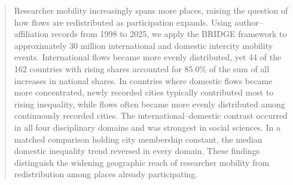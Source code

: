 \begin{abstract}
\noindent Researcher mobility increasingly spans more places, raising the question of how flows are redistributed as participation expands. Using author--affiliation records from 1998 to 2025, we apply the BRIDGE framework to approximately 30 million international and domestic intercity mobility events. International flows became more evenly distributed, yet 44 of the 162 countries with rising shares accounted for 85.0\% of the sum of all increases in national shares. In countries where domestic flows became more concentrated, newly recorded cities typically contributed most to rising inequality, while flows often became more evenly distributed among continuously recorded cities. The international--domestic contrast occurred in all four disciplinary domains and was strongest in social sciences. In a matched comparison holding city membership constant, the median domestic inequality trend reversed in every domain. These findings distinguish the widening geographic reach of researcher mobility from redistribution among places already participating.
\end{abstract}

